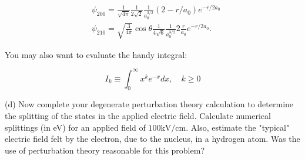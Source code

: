 \documentclass[12pt]{article}
\begin{document}
$$
\begin{aligned}
& \psi_{200}=\frac{1}{\sqrt{4 \pi}} \frac{1}{2 \sqrt{2}} \frac{1}{a_{0}^{3 / 2}}\left(2-r / a_{0}\right) e^{-r / 2 a_{0}} \\
& \psi_{210}=\sqrt{\frac{3}{4 \pi}} \cos \theta \frac{1}{4 \sqrt{6}} \frac{1}{a_{0}^{3 / 2}} 2 \frac{r}{a_{0}} e^{-r / 2 a_{0}} .
\end{aligned}
$$

You may also want to evaluate the handy integral:

$$
I_{k} \equiv \int_{0}^{\infty} x^{k} e^{-x} d x, \quad k \geq 0
$$

(d) Now complete your degenerate perturbation theory calculation to determine the splitting of the states in the applied electric field. Calculate numerical splittings (in eV) for an applied field of $100 \mathrm{kV} / \mathrm{cm}$. Also, estimate the "typical" electric field felt by the electron, due to the nucleus, in a hydrogen atom. Was the use of perturbation theory reasonable for this problem?
\end{document}
